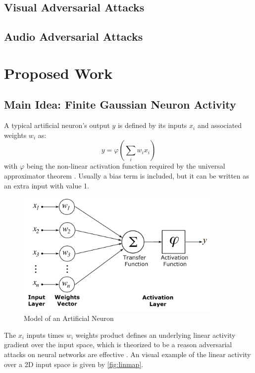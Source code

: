 \documentclass[12pt,oneside]{CUNY_PhD}
\begin{document}
\subsection{Visual Adversarial Attacks}
\subsection{Audio Adversarial Attacks}

\section{Proposed Work}
\subsection{Main Idea: Finite Gaussian Neuron Activity}
A typical artificial neuron's output $y$ is defined by its inputs $x_i$ and associated weights $w_i$ as: 
\[ y = \varphi(\sum_{i}w_i x_i) \]
with $\varphi$ being the non-linear activation function required by the universal approximator theorem \cite{cybenko1989approximation, hornik1989multilayer}. Usually a bias term is included, but it can be written as an extra input with value 1. 

\begin{figure}[!htbp]
\centering
\includegraphics[width=0.9\textwidth]{images/artificial_neuron_model.png}
\caption{Model of an Artificial Neuron}
\label{fig:neuron}
\end{figure}

The $x_i$ inputs times $w_i$ weights product defines an underlying linear activity gradient over the input space, which is theorized to be a reason adversarial attacks on neural networks are effective \cite{46153}. An visual example of the linear activity over a 2D input space is given by \ref{fig:linmap}.
\end{document}
